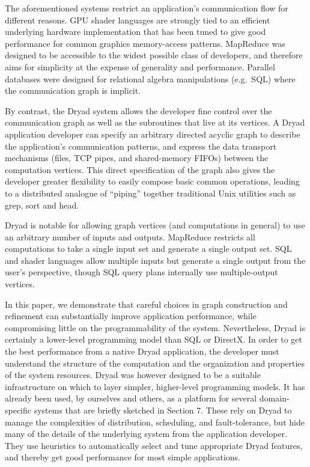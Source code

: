 \documentclass[
]{article}
\begin{document}
The aforementioned systems restrict an application's communication flow
for different reasons. GPU shader languages are strongly tied to an
efficient underlying hardware implementation that has been tuned to give
good performance for common graphics memory-access patterns. MapReduce
was designed to be accessible to the widest possible class of
developers, and therefore aims for simplicity at the expense of
generality and performance. Parallel databases were designed for
relational algebra manipulations (e.g.~SQL) where the communication
graph is implicit.

By contrast, the Dryad system allows the developer fine control over the
communication graph as well as the subroutines that live at its
vertices. A Dryad application developer can specify an arbitrary
directed acyclic graph to describe the application's communication
patterns, and express the data transport mechanisms (files, TCP pipes,
and shared-memory FIFOs) between the computation vertices. This direct
specification of the graph also gives the developer greater flexibility
to easily compose basic common operations, leading to a distributed
analogue of ``piping'' together traditional Unix utilities such as grep,
sort and head.

Dryad is notable for allowing graph vertices (and computations in
general) to use an arbitrary number of inputs and outputs. MapReduce
restricts all computations to take a single input set and generate a
single output set. SQL and shader languages allow multiple inputs but
generate a single output from the user's perspective, though SQL query
plans internally use multiple-output vertices.

In this paper, we demonstrate that careful choices in graph construction
and refinement can substantially improve application performance, while
compromising little on the programmability of the system. Nevertheless,
Dryad is certainly a lower-level programming model than SQL or DirectX.
In order to get the best performance from a native Dryad application,
the developer must understand the structure of the computation and the
organization and properties of the system resources. Dryad was however
designed to be a suitable infrastructure on which to layer simpler,
higher-level programming models. It has already been used, by ourselves
and others, as a platform for several domain-specific systems that are
briefly sketched in Section 7. These rely on Dryad to manage the
complexities of distribution, scheduling, and fault-tolerance, but hide
many of the details of the underlying system from the application
developer. They use heuristics to automatically select and tune
appropriate Dryad features, and thereby get good performance for most
simple applications.
\end{document}
